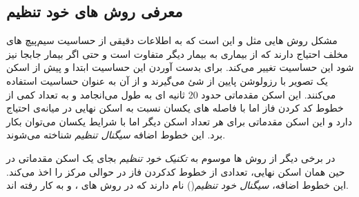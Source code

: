 \subsection{معرفی روش های خود تنظیم}
مشکل روش هایی مثل 
و 
این است که به اطلاعات دقیقی از حساسیت سیم‌پیچ های مخلف احتیاج دارند که از بیماری به بیمار دیگر متفاوت است و حتی اگر بیمار جابجا نیز شود این حساسیت تغییر می‌کند. برای بدست آوردن این حساسیت ابتدا و پیش از اسکن یک تصویر با رزولوشن پایین از شئ می‌گیرند و از آن به عنوان حساسیت استفاده می‌کنند. این اسکن مقدماتی حدود 20 ثانیه ای به طول می‌انجامد و به تعداد کمی از خطوط کد کردن فاز اما با فاصله های یکسان نسبت به اسکن نهایی در میانه‌ی \kspace احتیاج دارد و این اسکن مقدماتی برای هر تعداد اسکن دیگر اما با شرایط یکسان می‌توان بکار برد. این خطوط اضافه \textit{سیگنال تنظیم}
شناخته می‌شوند.

در برخی دیگر از روش ها موسوم به \textit{تکنیک خود تنظیم}
بجای یک اسکن مقدماتی در حین همان اسکن نهایی، تعدادی از خطوط کدکردن فاز در حوالی مرکز \kspace را اخذ می‌کند. این خطوط اضافه،
\textit{سیگنال خود تنظیم}()
نام دارند که در روش های 
،  و 
به کار رفته اند.




